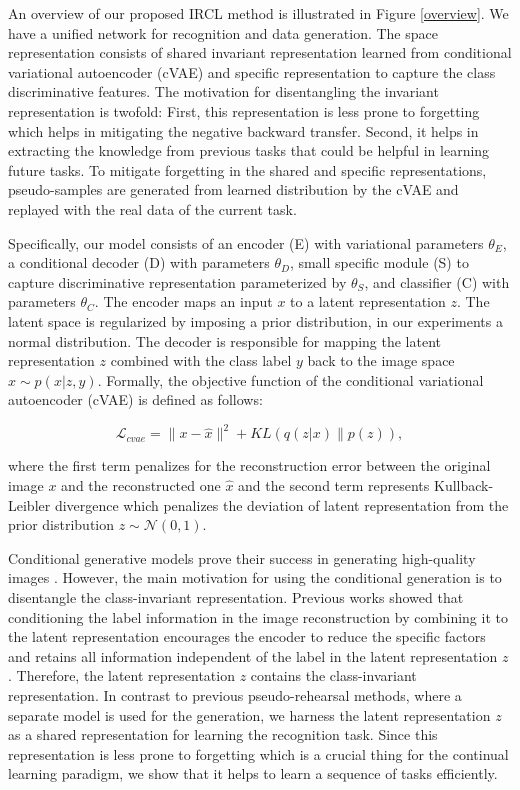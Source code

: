 \documentclass[letterpaper]{article} %
\begin{document}
An overview of our proposed IRCL method is illustrated in Figure \ref{overview}. We have a unified network for recognition and data generation. The space representation consists of shared invariant representation learned from conditional variational autoencoder (cVAE) and specific representation to capture the class discriminative features. The motivation for disentangling the invariant representation is twofold: First, this representation is less prone to forgetting which helps in mitigating the negative backward transfer. Second, it helps in extracting the knowledge from previous tasks that could be helpful in learning future tasks. To mitigate forgetting in the shared and specific representations, pseudo-samples are generated from learned distribution by the cVAE and replayed with the real data of the current task.

Specifically, our model consists of an encoder (E) with variational parameters $\theta_{E}$, a conditional decoder (D) with parameters $\theta_{D}$, small specific module (S) to capture discriminative representation parameterized by $\theta_{S}$, and classifier (C) with parameters $\theta_{C}$. The encoder maps an input $x$ to a latent representation $z$. The latent space is regularized by imposing a prior distribution, in our experiments a normal
distribution. The decoder is responsible for mapping the latent representation $z$ combined with the class label $y$ back to the image space $\hat{x} \sim p(x|z,y)$. Formally, the objective function of the conditional variational autoencoder (cVAE) is defined as follows:

\begin{equation}
 \mathcal{L}_{cvae} = \|x- \hat{x}\|^{2} + KL(q(z|x)\|p(z)),
\label{vaeLoss}
\end{equation}

where the first term penalizes for the reconstruction error between the original image $x$ and the reconstructed one $\hat{x}$ and the second term represents Kullback-Leibler divergence which penalizes the deviation of latent representation from the prior distribution  $z \sim \mathcal{N}(0,1)$.

Conditional generative models prove their success in generating high-quality images \cite{miyato2018cgans,odena2017conditional}. However, the main motivation for using the conditional generation is to disentangle the class-invariant representation. Previous works \cite{makhzani2015adversarial,chen2020cyclically} showed that conditioning the label information in the image reconstruction by combining it to the latent representation encourages the encoder to reduce the specific factors and retains all information independent of the label in the latent representation $z$. Therefore, the latent representation $z$ contains the class-invariant representation. In contrast to previous pseudo-rehearsal methods, where a separate model is used for the generation, we harness the latent representation $z$ as a shared representation for learning the recognition task. Since this representation is less prone to forgetting which is a crucial thing for the continual learning paradigm, we show that it helps to learn a sequence of tasks efficiently.
\end{document}
